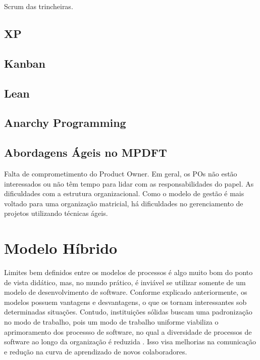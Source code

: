 \documentclass[
	article,			%
	11pt,				%
	oneside,			%
	a4paper,			%
	english,			%
	brazil,				%
	sumario=tradicional
	]{abntex2}
\begin{document}
Scrum das trincheiras.

   \lipsum[1]

\subsection{XP}

   \lipsum[1]

\subsection{Kanban}

   \lipsum[1]

\subsection{Lean}

   \lipsum[1]

\subsection{Anarchy Programming}

   \lipsum[1]

\subsection{Abordagens Ágeis no MPDFT}

    Falta de comprometimento do Product Owner. Em geral, os POs não estão
    interessados ou não têm tempo para lidar com as responsabilidades do papel.
    As dificuldades com a estrutura organizacional. Como o modelo de gestão é
    mais voltado para uma organização matricial, há dificuldades no
    gerenciamento de projetos utilizando técnicas ágeis.

   \lipsum[1]

\section{Modelo Híbrido}

Limites bem definidos entre os modelos de processos é algo muito bom do ponto de
vista didático, mas, no mundo prático, é inviável se utilizar somente de um
modelo de desenvolvimento de software. Conforme explicado anteriormente, os
modelos possuem vantagens e desvantagens, o que os tornam interessantes sob
determinadas situações. Contudo, instituições sólidas buscam uma padronização no
modo de trabalho, pois um modo de trabalho uniforme viabiliza o aprimoramento
dos processso de software, no qual a diversidade de processos de software ao
longo da organização é reduzida \cite{sommerville2007}. Isso visa melhorias na
comunicação e redução na curva de aprendizado de novos colaboradores.
\end{document}
